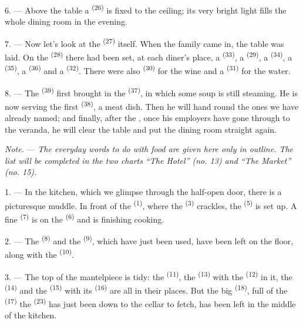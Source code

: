6. --- Above the table a  \textsuperscript{(26)} is fixed to the ceiling;
its very bright light fills the whole dining room in the evening.

7. --- Now let's look at the  \textsuperscript{(27)} itself. When the
family came in, the table was laid. On the  \textsuperscript{(28)} there
had been set, at each diner's place, a  \textsuperscript{(33)}, a
 \textsuperscript{(29)}, a  \textsuperscript{(34)}, a
 \textsuperscript{(35)}, a  \textsuperscript{(36)} and a
 \textsuperscript{(32)}. There were also
 \textsuperscript{(30)} for the wine and a 
\textsuperscript{(31)} for the water.

8. --- The  \textsuperscript{(39)} first brought in the
 \textsuperscript{(37)}, in which some soup is still steaming.
He is now serving the first  \textsuperscript{(38)}, a meat dish. Then he will
hand round the ones we have already named; and finally, after the , once his
employers have gone through to the veranda, he will clear the table and put the dining room
straight again.

\textit{Note.} --- \textit{The everyday words to do with food are given here only in outline.
The list will be completed in the two charts “The Hotel” (no. 13) and “The Market” (no. 15).}

\VUsaut{4.6mm}
\VUsaut{3.0mm}

1. --- In the kitchen, which we glimpse through the half-open door, there is a picturesque
muddle. In front of the  \textsuperscript{(1)}, where the 
\textsuperscript{(3)} crackles, the  \textsuperscript{(5)} is set up. A
fine  \textsuperscript{(7)} is on the
 \textsuperscript{(6)} and is finishing cooking.

2. --- The  \textsuperscript{(8)} and the 
\textsuperscript{(9)}, which have just been used, have been left on the floor, along with the
 \textsuperscript{(10)}.

3. --- The top of the mantelpiece is tidy: the  \textsuperscript{(11)}, the
 \textsuperscript{(13)} with the
 \textsuperscript{(12)} in it, the 
\textsuperscript{(14)} and the  \textsuperscript{(15)} with its
 \textsuperscript{(16)} are all in their places. But the big
 \textsuperscript{(18)}, full of the 
\textsuperscript{(17)} the  \textsuperscript{(23)} has just been down to the
cellar to fetch, has been left in the middle of the kitchen.

